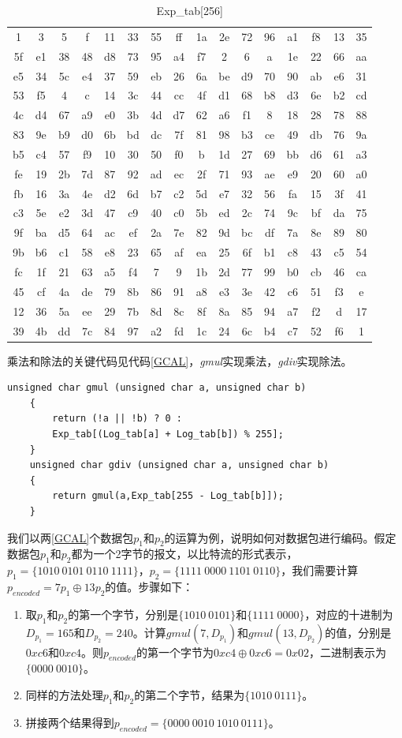 \begin{table}[htb]
	\caption{Exp\_tab[256]}
	\centering
	\begin{tabular}{cccccccccccccccc}
		\toprule
 1& 3& 5& f&11&33&55&ff&1a&2e&72&96&a1&f8&13&35\\
5f&e1&38&48&d8&73&95&a4&f7& 2& 6& a&1e&22&66&aa\\
e5&34&5c&e4&37&59&eb&26&6a&be&d9&70&90&ab&e6&31\\
53&f5& 4& c&14&3c&44&cc&4f&d1&68&b8&d3&6e&b2&cd\\
4c&d4&67&a9&e0&3b&4d&d7&62&a6&f1& 8&18&28&78&88\\
83&9e&b9&d0&6b&bd&dc&7f&81&98&b3&ce&49&db&76&9a\\
b5&c4&57&f9&10&30&50&f0& b&1d&27&69&bb&d6&61&a3\\
fe&19&2b&7d&87&92&ad&ec&2f&71&93&ae&e9&20&60&a0\\
fb&16&3a&4e&d2&6d&b7&c2&5d&e7&32&56&fa&15&3f&41\\
c3&5e&e2&3d&47&c9&40&c0&5b&ed&2c&74&9c&bf&da&75\\
9f&ba&d5&64&ac&ef&2a&7e&82&9d&bc&df&7a&8e&89&80\\
9b&b6&c1&58&e8&23&65&af&ea&25&6f&b1&c8&43&c5&54\\
fc&1f&21&63&a5&f4& 7& 9&1b&2d&77&99&b0&cb&46&ca\\
45&cf&4a&de&79&8b&86&91&a8&e3&3e&42&c6&51&f3& e\\
12&36&5a&ee&29&7b&8d&8c&8f&8a&85&94&a7&f2& d&17\\
39&4b&dd&7c&84&97&a2&fd&1c&24&6c&b4&c7&52&f6& 1\\
		\bottomrule
	\end{tabular}
	\label{Exptab}
\end{table}
乘法和除法的关键代码见代码\ref{GCAL}，\emph{gmul}实现乘法，\emph{gdiv}实现除法。
	\begin{lstlisting}[float,caption=gmul和gdiv实现,label={GCAL},language={[ANSI]C}]
	unsigned char gmul (unsigned char a, unsigned char b)
	{
		return (!a || !b) ? 0 : 
		Exp_tab[(Log_tab[a] + Log_tab[b]) % 255];
	}
	unsigned char gdiv (unsigned char a, unsigned char b)
	{
		return gmul(a,Exp_tab[255 - Log_tab[b]]);
	}
	\end{lstlisting}

\par
我们以两\ref{GCAL}个数据包$p_{1}$和$p_{2}$的运算为例，说明如何对数据包进行编码。假定数据包$p_{1}$和$p_{2}$都为一个2字节的报文，以比特流的形式表示，$p_{1}=\{1010\ 0101\ 0110\ 1111\}$，$p_{2}=\{1111\ 0000\ 1101\ 0110\}$，我们需要计算$p_{encoded}=7p_{1} \oplus 13p_{2}$的值。步骤如下：
\begin{enumerate}[fullwidth,itemindent=2em,label=(\arabic*)]
	\item 取$p_{1}$和$p_{2}$的第一个字节，分别是$\{1010\ 0101\}$和$\{1111\ 0000\}$，对应的十进制为$D_{p_1}=165$和$D_{p_2}=240$。计算$gmul\left(7,D_{p_1}\right)$和$gmul\left(13,D_{p_2}\right)$的值，分别是$0xc6$和$0xc4$。则$p_{encoded}$的第一个字节为$0xc4 \oplus 0xc6=0x02$，二进制表示为$\{0000\ 0010\}$。
	\item 同样的方法处理$p_{1}$和$p_{2}$的第二个字节，结果为$\{1010\ 0111\}$。
	\item 拼接两个结果得到$p_{encoded}=\{0000\ 0010\ 1010\ 0111\}$。
\end{enumerate}

